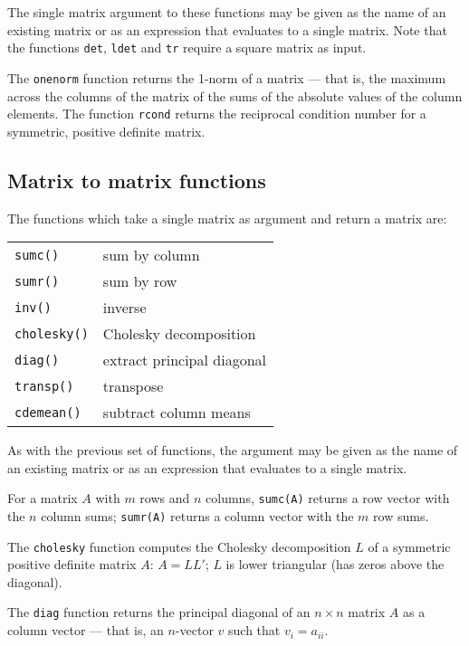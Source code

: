The single matrix argument to these functions may be given as the name
of an existing matrix or as an expression that evaluates to a single
matrix.  Note that the functions \texttt{det}, \texttt{ldet} and
\texttt{tr} require a square matrix as input.  

The \texttt{onenorm} function returns the 1-norm of a matrix --- that
is, the maximum across the columns of the matrix of the sums of the
absolute values of the column elements.  The function \texttt{rcond}
returns the reciprocal condition number for a symmetric, positive
definite matrix.

\subsection{Matrix to matrix functions}
\label{matrix-to-matrix}

The functions which take a single matrix as argument and return a
matrix are:

\begin{center}
\begin{tabular}{ll}
\texttt{sumc()} & sum by column \\
\texttt{sumr()} & sum by row \\
\texttt{inv()} & inverse \\
\texttt{cholesky()} & Cholesky decomposition \\
\texttt{diag()} & extract principal diagonal \\
\texttt{transp()} & transpose \\
\texttt{cdemean()} & subtract column means 
\end{tabular}
\end{center}

As with the previous set of functions, the argument may be given as
the name of an existing matrix or as an expression that evaluates to a
single matrix.

For a matrix $A$ with $m$ rows and $n$ columns, \texttt{sumc(A)}
returns a row vector with the $n$ column sums; \texttt{sumr(A)}
returns a column vector with the $m$ row sums.

The \texttt{cholesky} function computes the Cholesky decomposition $L$
of a symmetric positive definite matrix $A$: $A = LL'$; $L$ is lower
triangular (has zeros above the diagonal).  

The \texttt{diag} function returns the principal diagonal of an
$n\times n$ matrix $A$ as a column vector --- that is, an
$n$-vector $v$ such that $v_i = a_{ii}$.

